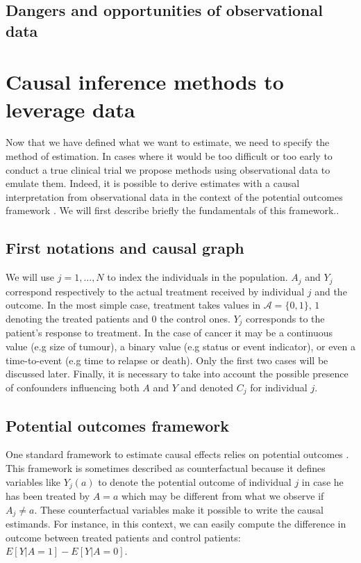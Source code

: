 \documentclass[a4paper,12pt,twoside,onecolumn,openright,final,oldfontcommands]{memoir}
\begin{document}
\subsection{Dangers and opportunities of observational
data}\label{dangers-and-opportunities-of-observational-data}

\section{Causal inference methods to leverage
data}\label{causal-inference-methods-to-leverage-data}

Now that we have defined what we want to estimate, we need to specify
the method of estimation. In cases where it would be too difficult or
too early to conduct a true clinical trial we propose methods using
observational data to emulate them. Indeed, it is possible to derive
estimates with a causal interpretation from observational data in the
context of the potential outcomes framework \citep{rubin1974estimating}.
We will first describe briefly the fundamentals of this framework..

\subsection{First notations and causal
graph}\label{first-notations-and-causal-graph}

We will use \(j=1,...,N\) to index the individuals in the population.
\(A_j\) and \(Y_j\) correspond respectively to the actual treatment
received by individual \(j\) and the outcome. In the most simple case,
treatment takes values in \(\mathcal{A}=\{0, 1\}\), \(1\) denoting the
treated patients and \(0\) the control ones. \(Y_j\) corresponds to the
patient's response to treatment. In the case of cancer it may be a
continuous value (e.g size of tumour), a binary value (e.g status or
event indicator), or even a time-to-event (e.g time to relapse or
death). Only the first two cases will be discussed later. Finally, it is
necessary to take into account the possible presence of confounders
influencing both \(A\) and \(Y\) and denoted \(C_j\) for individual
\(j\).

\subsection{Potential outcomes
framework}\label{potential-outcomes-framework}

One standard framework to estimate causal effects relies on potential
outcomes \citep{rubin1974estimating}. This framework is sometimes
described as counterfactual because it defines variables like \(Y_j(a)\)
to denote the potential outcome of individual \(j\) in case he has been
treated by \(A=a\) which may be different from what we observe if
\(A_j\neq a\). These counterfactual variables make it possible to write
the causal estimands. For instance, in this context, we can easily
compute the difference in outcome between treated patients and control
patients: \(E[Y | A=1] - E[Y | A=0].\)
\end{document}
